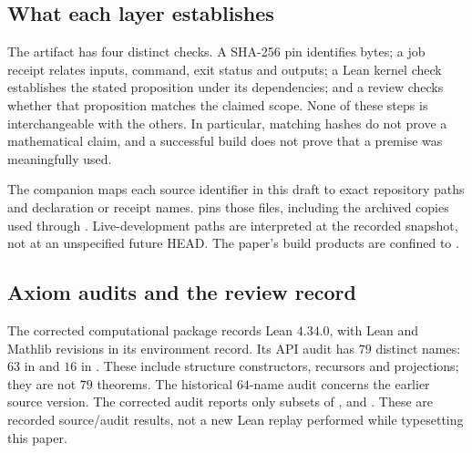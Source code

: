 \subsection{What each layer establishes}
The artifact has four distinct checks. A SHA-256 pin identifies bytes;
a job receipt relates inputs, command, exit status and outputs; a Lean
kernel check establishes the stated proposition under its dependencies;
and a review checks whether that proposition matches the claimed scope.
None of these steps is interchangeable with the others. In particular,
matching hashes do not prove a mathematical claim, and a successful
build does not prove that a premise was meaningfully used.

The companion  maps each source identifier in this
draft to exact repository paths and declaration or receipt names.
 pins those files, including the archived copies
used through . Live-development paths
are interpreted at the recorded snapshot, not at an unspecified future
HEAD. The paper's build products are confined to .

\subsection{Axiom audits and the review record}
The corrected computational package records Lean $4.34.0$, with Lean
and Mathlib revisions in its environment record. Its API audit has
$79$ distinct names: $63$ in  and $16$ in
. These include structure constructors, recursors
and projections; they are not $79$ theorems. The historical $64$-name
audit concerns the earlier source version. The corrected audit reports
only subsets of ,  and
. These are recorded source/audit results, not a new
Lean replay performed while typesetting this paper.


